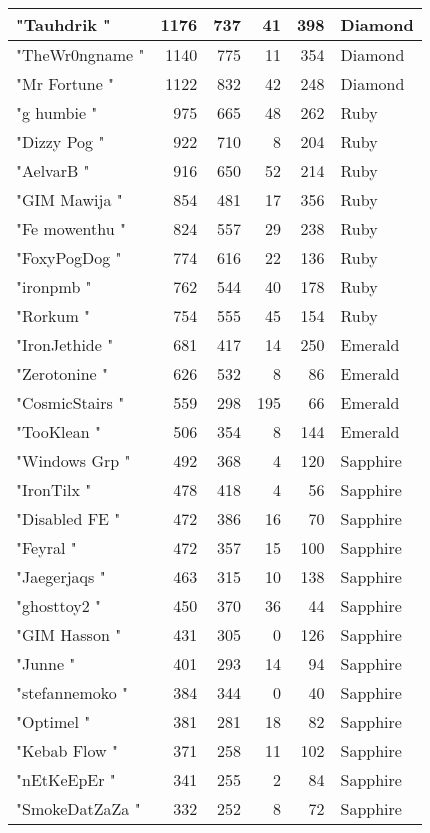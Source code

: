 \documentclass{article}
\begin{document}
\begin{table}[htbp]
\begin{tabular}{|l|r|r|r|r|l|}
"Tauhdrik " & 1176 & 737 & 41 & 398 & Diamond \\ \hline
"TheWr0ngname " & 1140 & 775 & 11 & 354 & Diamond \\ \hline
"Mr Fortune " & 1122 & 832 & 42 & 248 & Diamond \\ \hline
"g humbie " & 975 & 665 & 48 & 262 & Ruby \\ \hline
"Dizzy Pog " & 922 & 710 & 8 & 204 & Ruby \\ \hline
"AelvarB " & 916 & 650 & 52 & 214 & Ruby \\ \hline
"GIM Mawija " & 854 & 481 & 17 & 356 & Ruby \\ \hline
"Fe mowenthu " & 824 & 557 & 29 & 238 & Ruby \\ \hline
"FoxyPogDog " & 774 & 616 & 22 & 136 & Ruby \\ \hline
"ironpmb " & 762 & 544 & 40 & 178 & Ruby \\ \hline
"Rorkum " & 754 & 555 & 45 & 154 & Ruby \\ \hline
"IronJethide " & 681 & 417 & 14 & 250 & Emerald \\ \hline
"Zerotonine " & 626 & 532 & 8 & 86 & Emerald \\ \hline
"CosmicStairs " & 559 & 298 & 195 & 66 & Emerald \\ \hline
"TooKlean " & 506 & 354 & 8 & 144 & Emerald \\ \hline
"Windows Grp " & 492 & 368 & 4 & 120 & Sapphire \\ \hline
"IronTilx " & 478 & 418 & 4 & 56 & Sapphire \\ \hline
"Disabled FE " & 472 & 386 & 16 & 70 & Sapphire \\ \hline
"Feyral " & 472 & 357 & 15 & 100 & Sapphire \\ \hline
"Jaegerjaqs " & 463 & 315 & 10 & 138 & Sapphire \\ \hline
"ghosttoy2 " & 450 & 370 & 36 & 44 & Sapphire \\ \hline
"GIM Hasson " & 431 & 305 & 0 & 126 & Sapphire \\ \hline
"Junne " & 401 & 293 & 14 & 94 & Sapphire \\ \hline
"stefannemoko " & 384 & 344 & 0 & 40 & Sapphire \\ \hline
"Optimel " & 381 & 281 & 18 & 82 & Sapphire \\ \hline
"Kebab Flow " & 371 & 258 & 11 & 102 & Sapphire \\ \hline
"nEtKeEpEr " & 341 & 255 & 2 & 84 & Sapphire \\ \hline
"SmokeDatZaZa " & 332 & 252 & 8 & 72 & Sapphire \\ \hline

\end{tabular}
\end{table}
\end{document}
